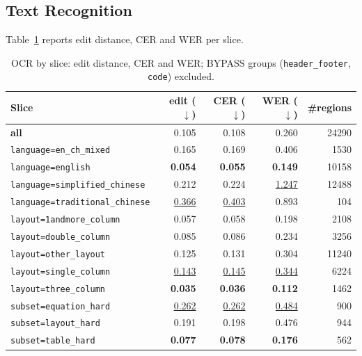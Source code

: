 \subsection{Text Recognition}

Table~\ref{tab:app-res-ocr} reports edit distance, CER and WER per slice.

\begin{table}[H]
\centering
\setlength{\abovecaptionskip}{4pt}
\setlength{\aboverulesep}{1.5pt}
\setlength{\belowrulesep}{1.5pt}
\renewcommand{\arraystretch}{0.95}
\caption{OCR by slice: edit distance, CER and WER; BYPASS groups
(\texttt{header\_footer}, \texttt{code}) excluded.}
\label{tab:app-res-ocr}
\scriptsize
\begin{tabular}{@{}l r r r r@{}}
\toprule
Slice & edit ($\downarrow$) & CER ($\downarrow$) & WER ($\downarrow$) & \#regions \\
\midrule
    \textbf{all} & 0.105 & 0.108 & 0.260 & 24290 \\ \midrule
    \texttt{language=en\_ch\_mixed} & 0.165 & 0.169 & 0.406 & 1530 \\
    \texttt{language=english} & \textbf{0.054} & \textbf{0.055} & \textbf{0.149} & 10158 \\
    \texttt{language=simplified\_chinese} & 0.212 & 0.224 & \underline{1.247} & 12488 \\
    \texttt{language=traditional\_chinese} & \underline{0.366} & \underline{0.403} & 0.893 & 104 \\
    \midrule
    \texttt{layout=1andmore\_column} & 0.057 & 0.058 & 0.198 & 2108 \\
    \texttt{layout=double\_column} & 0.085 & 0.086 & 0.234 & 3256 \\
    \texttt{layout=other\_layout} & 0.125 & 0.131 & 0.304 & 11240 \\
    \texttt{layout=single\_column} & \underline{0.143} & \underline{0.145} & \underline{0.344} & 6224 \\
    \texttt{layout=three\_column} & \textbf{0.035} & \textbf{0.036} & \textbf{0.112} & 1462 \\
    \midrule
    \texttt{subset=equation\_hard} & \underline{0.262} & \underline{0.262} & \underline{0.484} & 900 \\
    \texttt{subset=layout\_hard} & 0.191 & 0.198 & 0.476 & 944 \\
    \texttt{subset=table\_hard} & \textbf{0.077} & \textbf{0.078} & \textbf{0.176} & 562 \\

\end{tabular}
\end{table}
